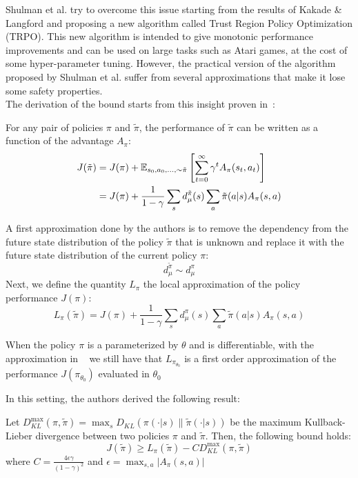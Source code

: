 Shulman et al. try to overcome this issue starting from the results of Kakade \& Langford and proposing a new algorithm called Trust Region Policy Optimization (TRPO). This new algorithm is intended to give monotonic performance improvements and can be used on large tasks such as Atari games, at the cost of some hyper-parameter tuning. However, the practical version of the algorithm proposed by Shulman et al. suffer from several approximations that make it lose some safety properties.\\
The derivation of the bound starts from this insight proven in~\cite{natural}:
\begin{lemma}
For any pair of policies $\pi$ and $\tilde{\pi}$, the performance of $\tilde{\pi}$ can be written as a function of the advantage $A_\pi$:
\begin{align*}
J(\tilde{\pi}) &= J(\pi) + \EV[s_0, a_0, \ldots,\sim\tilde{\pi}]{\sum_{t=0}^{\infty}\gamma^t A_\pi(s_t,a_t)} \\&= J(\pi) + \frac{1}{1-\gamma}\sum_s d_{\mu}^{\tilde{\pi}}(s)\sum_a \tilde{\pi}(a|s)A_\pi(s,a)
\end{align*}
\end{lemma}

A first approximation done by the authors is to remove the dependency from the future state distribution of the policy $\tilde{\pi}$ that is unknown and replace it with the future state distribution of the current policy $\pi$:
\begin{equation}
\label{eq:trpo-first-approx}
d_\mu^{\tilde{\pi}}\sim d_\mu^{\pi}
\end{equation}
Next, we define the quantity $L_\pi$ the local approximation of the policy performance $J(\pi)$:
\[
L_\pi(\tilde{\pi}) = J(\pi) + \frac{1}{1-\gamma}\sum_s d_\mu^{\pi}(s) \sum_a \tilde{\pi}(a|s) A_\pi(s,a)
\]
\begin{note}
When the policy $\pi$ is a parameterized by $\theta$ and is differentiable, with the approximation in ~ we still have that $L_{\pi_{\theta_0}}$ is a first order approximation of the performance $J(\pi_{\theta_0})$ evaluated in $\theta_0$
\end{note}

In this setting, the authors derived the following result:
\begin{theorem}
\label{th:trpo-main}
Let $D_{KL}^{\max}(\pi, \tilde{\pi}) = \max_s D_{KL}(\pi(\cdot|s) \parallel \tilde{\pi}(\cdot|s))$ be the maximum Kullback-Lieber divergence between two policies $\pi$ and $\tilde{\pi}$. Then, the following bound holds:
\[
J(\tilde{\pi})\geq L_\pi(\tilde{\pi})-CD_{KL}^{\max}(\pi, \tilde{\pi})
\]
where $C = \frac{4\epsilon\gamma}{(1-\gamma)^2}$ and $\epsilon = \max_{s,a}|A_\pi (s,a)|$
\end{theorem}

